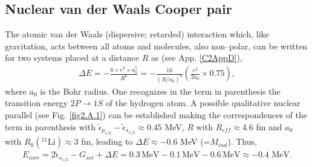  \begin{subappendices}
 \section{Nuclear van der Waals Cooper pair}\label{C2SG2}
 The atomic van der Waals (dispersive; retarded) interaction which, like gravitation,  acts between all atoms and molecules, also non--polar, can be written for two systems placed at a distance $R$ as (see App. \ref{C2AppD}), 
 \begin{align}\label{eq1C2AppG}
 \Delta E=-\frac{6\times e^2 \times a_0^5}{R^6}=-\frac{16}{(R/a_0)^6}\left(\frac{e^2}{2a_0}\times 0.75\right),
 \end{align}
 where $a_0$ is the Bohr radius. One recognizes in the term in parenthesis the transition energy $2P\to1S$ of the hydrogen atom. A possible qualitative nuclear parallel (see Fig. \ref{fig2.A.1})  can be established making the  correspondences  of the term in parenthesis with $\tilde\epsilon_{p_{1/2}}-\tilde\epsilon_{s_{1/2}}\approx0.45$ MeV, $R$ with $R_{eff}\approx4.6$ fm and $a_0$ with $R_0(^{11}\text{Li})\approx3$ fm, leading to $\Delta E\approx-0.6$ MeV (=$M_{ind}$).
  Thus,
 \begin{align*}
E_{corr}=2\tilde{\epsilon}_{s_{1/2}}-G_{scr}+\Delta E=0.3\,\text{MeV}-0.1\,\text{MeV}-0.6\,\text{MeV}\approx -0.4\text{ MeV}.
 \end{align*} 



\end{subappendices}
